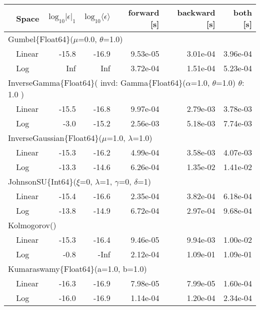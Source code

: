 \begin{tabular}{|llrrrrr|} \hline
& Space & $\mbox{log}_{10}|\epsilon|_1$ & $\mbox{log}_{10}\langle\epsilon\rangle$ & forward [s] & backward [s] & both [s]\\ \hline
\multicolumn{7}{|l|}{Gumbel\{Float64\}($\mu$=0.0, $\theta$=1.0)}\\ \hline
& Linear & {\color{blue}-15.8} & {\color{blue}-16.9} & {\color{blue}9.53e-05} & 3.01e-04 & {\color{blue}3.96e-04}\\
& Log & Inf & Inf & 3.72e-04 & {\color{blue}1.51e-04} & 5.23e-04\\
\hline
\multicolumn{7}{|l|}{InverseGamma\{Float64\}(
invd: Gamma\{Float64\}($\alpha$=1.0, $\theta$=1.0)
$\theta$: 1.0
)
}\\ \hline
& Linear & {\color{blue}-15.5} & {\color{blue}-16.8} & {\color{blue}9.97e-04} & {\color{blue}2.79e-03} & {\color{blue}3.78e-03}\\
& Log & -3.0 & -15.2 & 2.56e-03 & 5.18e-03 & 7.74e-03\\
\hline
\multicolumn{7}{|l|}{InverseGaussian\{Float64\}($\mu$=1.0, $\lambda$=1.0)}\\ \hline
& Linear & {\color{blue}-15.3} & {\color{blue}-16.2} & {\color{blue}4.99e-04} & {\color{blue}3.58e-03} & {\color{blue}4.07e-03}\\
& Log & -13.3 & -14.6 & 6.26e-04 & 1.35e-02 & 1.41e-02\\
\hline
\multicolumn{7}{|l|}{JohnsonSU\{Int64\}($\xi$=0, $\lambda$=1, $\gamma$=0, $\delta$=1)}\\ \hline
& Linear & {\color{blue}-15.4} & {\color{blue}-16.6} & {\color{blue}2.35e-04} & 3.82e-04 & {\color{blue}6.18e-04}\\
& Log & -13.8 & -14.9 & 6.72e-04 & {\color{blue}2.97e-04} & 9.68e-04\\
\hline
\multicolumn{7}{|l|}{Kolmogorov()}\\ \hline
& Linear & {\color{blue}-15.3} & -16.4 & {\color{blue}9.46e-05} & {\color{blue}9.94e-03} & {\color{blue}1.00e-02}\\
& Log & -0.8 & {\color{blue}-Inf} & 2.12e-04 & 1.09e-01 & 1.09e-01\\
\hline
\multicolumn{7}{|l|}{Kumaraswamy\{Float64\}(a=1.0, b=1.0)}\\ \hline
& Linear & {\color{blue}-16.3} & {\color{blue}-16.9} & {\color{blue}7.98e-05} & {\color{blue}7.99e-05} & {\color{blue}1.60e-04}\\
& Log & -16.0 & -16.9 & 1.14e-04 & 1.20e-04 & 2.34e-04\\

\end{tabular}
